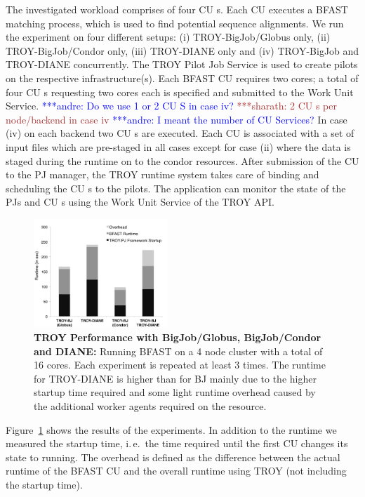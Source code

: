\documentclass[conference,final]{IEEEtran}
\newcommand{\alnote}[1]{ {\textcolor{blue} { ***andre: #1 }}}
\newcommand{\smnote}[1]{ {\textcolor{brown} { ***sharath: #1 }}}
\newcommand{\alnote}[1]{}
\newcommand{\smnote}[1]{}
\newcommand{\cu}{CU\xspace}
\newcommand{\up}{\vspace*{-1em}}
\begin{document}

The investigated workload comprises of four \cu s. Each \cu  executes a BFAST
matching process, which is used to find potential sequence alignments. We run
the experiment on four different setups: (i) TROY-BigJob/Globus only, (ii)
TROY-BigJob/Condor only, (iii) TROY-DIANE only and (iv) TROY-BigJob and
TROY-DIANE concurrently. The TROY Pilot Job Service is used to create pilots on
the respective infrastructure(s). Each BFAST \cu  requires two cores; a total of
four \cu s requesting two cores each is specified and submitted to the Work Unit
Service. 
\alnote{Do we use 1 or 2 \cu S in case iv? }   
\smnote{2 \cu s per node/backend in case iv }\alnote{I meant the number of \cu  
Services?}
 In case (iv) on each backend two \cu s are executed. 
 Each \cu  is associated with a set of input files which are pre-staged in 
 all cases except for case (ii) where the data is staged during the runtime on
 to the condor resources. After
submission of the \cu  to the PJ manager, the TROY runtime system takes care of
binding and scheduling the \cu s to the pilots. The application can monitor the
state of the PJs and \cu s using the Work Unit Service of the TROY API.

\begin{figure}[t]
	\centering
		\includegraphics[width=0.45\textwidth]{figures/NewTROYData.pdf}
	\caption{\textbf{TROY Performance with BigJob/Globus, BigJob/Condor and 
	DIANE:} Running BFAST on a 4 node cluster with a total of 16 cores. Each 
	experiment is repeated at least 3 times. The runtime for TROY-DIANE is 
	higher than for BJ mainly due to the higher startup time required and some 
	light runtime overhead caused by the additional worker agents required on 
	the resource.\up\up}

	\label{fig:perf_perf-bfast-bj}
\end{figure}

Figure~\ref{fig:perf_perf-bfast-bj} shows the results of the experiments. In 
addition to the runtime we measured the startup time, i.\,e.\ the time required 
until the first \cu  changes its state to running. The overhead is defined as the 
difference between the actual runtime of the BFAST \cu  and the overall runtime 
using TROY (not including the startup time).
\end{document}
